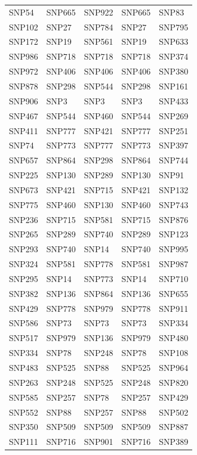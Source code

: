 \begin{table}[ht]
\begin{tabular}{lllll}
  SNP54 & SNP665 & SNP922 & SNP665 & SNP83 \\ 
  SNP102 & SNP27 & SNP784 & SNP27 & SNP795 \\ 
  SNP172 & SNP19 & SNP561 & SNP19 & SNP633 \\ 
  SNP986 & SNP718 & SNP718 & SNP718 & SNP374 \\ 
  SNP972 & SNP406 & SNP406 & SNP406 & SNP380 \\ 
  SNP878 & SNP298 & SNP544 & SNP298 & SNP161 \\ 
  SNP906 & SNP3 & SNP3 & SNP3 & SNP433 \\ 
  SNP467 & SNP544 & SNP460 & SNP544 & SNP269 \\ 
  SNP411 & SNP777 & SNP421 & SNP777 & SNP251 \\ 
  SNP74 & SNP773 & SNP777 & SNP773 & SNP397 \\ 
  SNP657 & SNP864 & SNP298 & SNP864 & SNP744 \\ 
  SNP225 & SNP130 & SNP289 & SNP130 & SNP91 \\ 
  SNP673 & SNP421 & SNP715 & SNP421 & SNP132 \\ 
  SNP775 & SNP460 & SNP130 & SNP460 & SNP743 \\ 
  SNP236 & SNP715 & SNP581 & SNP715 & SNP876 \\ 
  SNP265 & SNP289 & SNP740 & SNP289 & SNP123 \\ 
  SNP293 & SNP740 & SNP14 & SNP740 & SNP995 \\ 
  SNP324 & SNP581 & SNP778 & SNP581 & SNP987 \\ 
  SNP295 & SNP14 & SNP773 & SNP14 & SNP710 \\ 
  SNP382 & SNP136 & SNP864 & SNP136 & SNP655 \\ 
  SNP429 & SNP778 & SNP979 & SNP778 & SNP911 \\ 
  SNP586 & SNP73 & SNP73 & SNP73 & SNP334 \\ 
  SNP517 & SNP979 & SNP136 & SNP979 & SNP480 \\ 
  SNP334 & SNP78 & SNP248 & SNP78 & SNP108 \\ 
  SNP483 & SNP525 & SNP88 & SNP525 & SNP964 \\ 
  SNP263 & SNP248 & SNP525 & SNP248 & SNP820 \\ 
  SNP585 & SNP257 & SNP78 & SNP257 & SNP429 \\ 
  SNP552 & SNP88 & SNP257 & SNP88 & SNP502 \\ 
  SNP350 & SNP509 & SNP509 & SNP509 & SNP887 \\ 
  SNP111 & SNP716 & SNP901 & SNP716 & SNP389 \\ 

\end{tabular}
\end{table}
